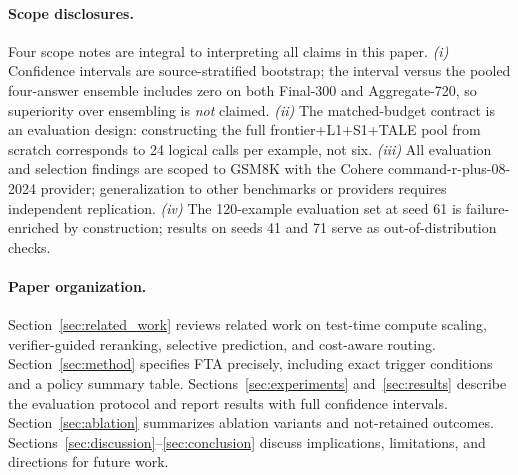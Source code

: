 \paragraph{Scope disclosures.}
Four scope notes are integral to interpreting all claims in this paper.
\emph{(i)} Confidence intervals are source-stratified bootstrap; the interval versus
the pooled four-answer ensemble includes zero on both Final-300 and Aggregate-720,
so superiority over ensembling is \emph{not} claimed.
\emph{(ii)} The matched-budget contract is an evaluation design: constructing the full
frontier+L1+S1+TALE pool from scratch corresponds to 24 logical calls per example,
not six.
\emph{(iii)} All evaluation and selection findings are scoped to GSM8K with the
Cohere command-r-plus-08-2024 provider; generalization to other benchmarks or
providers requires independent replication.
\emph{(iv)} The 120-example evaluation set at seed 61 is failure-enriched by
construction; results on seeds 41 and 71 serve as out-of-distribution checks.

\paragraph{Paper organization.}
Section~\ref{sec:related_work} reviews related work on test-time compute scaling,
verifier-guided reranking, selective prediction, and cost-aware routing.
Section~\ref{sec:method} specifies FTA precisely, including exact trigger conditions
and a policy summary table.
Sections~\ref{sec:experiments} and~\ref{sec:results} describe the evaluation protocol
and report results with full confidence intervals.
Section~\ref{sec:ablation} summarizes ablation variants and not-retained outcomes.
Sections~\ref{sec:discussion}--\ref{sec:conclusion} discuss implications, limitations,
and directions for future work.
